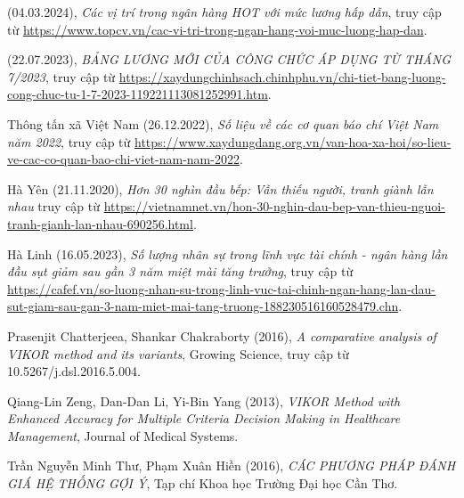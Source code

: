 \begin{thebibliography}{99}
    (04.03.2024),
    \emph{Các vị trí trong ngân hàng HOT với mức lương hấp dẫn},
    truy cập từ \href{https://www.topcv.vn/cac-vi-tri-trong-ngan-hang-voi-muc-luong-hap-dan#:~:text=Giao%20d%E1%BB%8Bch%20vi%C3%AAn%20ng%C3%A2n%20h%C3%A0ng%20c%C3%B3%20m%E1%BB%A9c%20l%C6%B0%C6%A1ng%20trung%20b%C3%ACnh,nh%E1%BA%ADt%20m%E1%BB%9Bi%20nh%E1%BA%A5t%20t%E1%BA%A1i%20TopCV! }{\color{black}https://www.topcv.vn/cac-vi-tri-trong-ngan-hang-voi-muc-luong-hap-dan}.

    (22.07.2023),
    \emph{BẢNG LƯƠNG MỚI CỦA CÔNG CHỨC ÁP DỤNG TỪ THÁNG 7/2023},
    truy cập từ \href{https://xaydungchinhsach.chinhphu.vn/chi-tiet-bang-luong-cong-chuc-tu-1-7-2023-119221113081252991.htm}{\color{black}https://xaydungchinhsach.chinhphu.vn/chi-tiet-bang-luong-cong-chuc-tu-1-7-2023-119221113081252991.htm}.

    Thông tấn xã Việt Nam (26.12.2022),
    \emph{Số liệu về các cơ quan báo chí Việt Nam năm 2022},
    truy cập từ \href{https://www.xaydungdang.org.vn/van-hoa-xa-hoi/so-lieu-ve-cac-co-quan-bao-chi-viet-nam-nam-2022-18260#:~:text=thanh%2C%20truy%E1%BB%81n%20h%C3%ACnh.-,N%C4%83m%202022%2C%20c%E1%BA%A3%20n%C6%B0%E1%BB%9Bc%20c%C3%B3%20127%20c%C6%A1%20quan%20b%C3%A1o%3B%20670,h%C3%ACnh%20x%E1%BA%A5p%20x%E1%BB%89%2016.500%20ng%C6%B0%E1%BB%9Di}{\color{black}https://www.xaydungdang.org.vn/van-hoa-xa-hoi/so-lieu-ve-cac-co-quan-bao-chi-viet-nam-nam-2022}.
    
    Hà Yên (21.11.2020),
    \emph{Hơn 30 nghìn đầu bếp: Vẫn thiếu người, tranh giành lẫn nhau}
    truy cập từ \href{https://vietnamnet.vn/hon-30-nghin-dau-bep-van-thieu-nguoi-tranh-gianh-lan-nhau-690256.html#:~:text=Vi%E1%BB%87t%20Nam%20hi%E1%BB%87n%20c%C3%B3%20kho%E1%BA%A3ng,th%E1%BB%B1c%20Vi%E1%BB%87t%20ra%20th%E1%BA%BF%20gi%E1%BB%9Bi}{\color{black}https://vietnamnet.vn/hon-30-nghin-dau-bep-van-thieu-nguoi-tranh-gianh-lan-nhau-690256.html}.
    
    Hà Linh (16.05.2023),
    \emph{Số lượng nhân sự trong lĩnh vực tài chính - ngân hàng lần đầu sụt giảm sau gần 3 năm miệt mài tăng trưởng},
    truy cập từ \href{https://cafef.vn/so-luong-nhan-su-trong-linh-vuc-tai-chinh-ngan-hang-lan-dau-sut-giam-sau-gan-3-nam-miet-mai-tang-truong-188230516160528479.chn}{\color{black}https://cafef.vn/so-luong-nhan-su-trong-linh-vuc-tai-chinh-ngan-hang-lan-dau-sut-giam-sau-gan-3-nam-miet-mai-tang-truong-188230516160528479.chn}.

    Prasenjit Chatterjeea, Shankar Chakraborty (2016),
    \emph{A comparative analysis of VIKOR method and its variants},
    Growing Science,
    truy cập từ 10.5267/j.dsl.2016.5.004.

    Qiang-Lin Zeng, Dan-Dan Li, Yi-Bin Yang (2013),
    \emph{VIKOR Method with Enhanced Accuracy for Multiple Criteria Decision Making in Healthcare Management},
    Journal of Medical Systems.

    Trần Nguyễn Minh Thư, Phạm Xuân Hiền (2016),
    \emph{CÁC PHƯƠNG PHÁP ĐÁNH GIÁ HỆ THỐNG GỢI Ý},
    Tạp chí Khoa học Trường Đại học Cần Thơ.
\end{thebibliography}